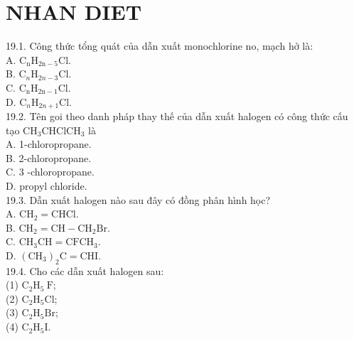 \documentclass[10pt]{article}
\begin{document}
\section*{NHAN DIET}
19.1. Công thức tổng quát của dẫn xuất monochlorine no, mạch hở là:\\
A. $\mathrm{C}_{\mathrm{n}} \mathrm{H}_{2 \mathrm{n}-5} \mathrm{Cl}$.\\
B. $\mathrm{C}_{n} \mathrm{H}_{2 n-3} \mathrm{Cl}$.\\
C. $\mathrm{C}_{\mathrm{n}} \mathrm{H}_{2 \mathrm{n}-1} \mathrm{Cl}$.\\
D. $\mathrm{C}_{n} \mathrm{H}_{2 n+1} \mathrm{Cl}$.\\
19.2. Tên goi theo danh pháp thay thế của dẫn xuất halogen có công thức cấu tạo $\mathrm{CH}_{3} \mathrm{CHClCH}_{3}$ là\\
A. 1-chloropropane.\\
B. 2-chloropropane.\\
C. 3 -chloropropane.\\
D. propyl chloride.\\
19.3. Dẫn xuất halogen nào sau đây có đồng phân hình học?\\
A. $\mathrm{CH}_{2}=\mathrm{CHCl}$.\\
B. $\mathrm{CH}_{2}=\mathrm{CH}-\mathrm{CH}_{2} \mathrm{Br}$.\\
C. $\mathrm{CH}_{3} \mathrm{CH}=\mathrm{CFCH}_{3}$.\\
D. $\left(\mathrm{CH}_{3}\right)_{2} \mathrm{C}=\mathrm{CHI}$.\\
19.4. Cho các dẫn xuất halogen sau:\\
(1) $\mathrm{C}_{2} \mathrm{H}_{5} \mathrm{~F}$;\\
(2) $\mathrm{C}_{2} \mathrm{H}_{5} \mathrm{Cl}$;\\
(3) $\mathrm{C}_{2} \mathrm{H}_{5} \mathrm{Br}$;\\
(4) $\mathrm{C}_{2} \mathrm{H}_{5} \mathrm{I}$.
\end{document}
